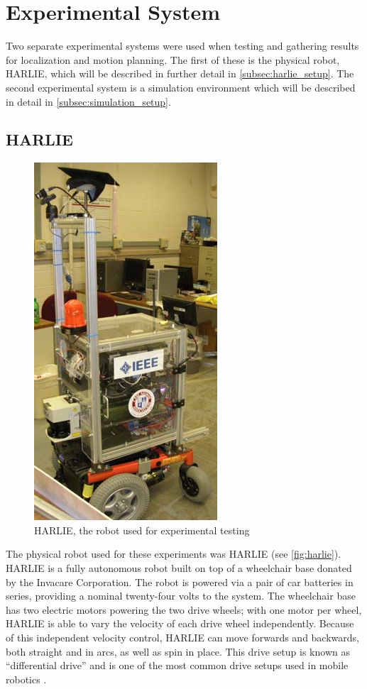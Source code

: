 \section{Experimental System}\label{sec:experimental_system}

Two separate experimental systems were used when testing and gathering results for localization and motion planning. The first of these is the physical robot, HARLIE, which will be described in further detail in \autoref{subsec:harlie_setup}. The second experimental system is a simulation environment which will be described in detail in \autoref{subsec:simulation_setup}.

\subsection{HARLIE}\label{subsec:harlie_setup}

\begin{figure}
\centering
\includegraphics[height=0.5\textheight]{images/harlie}
\caption{HARLIE, the robot used for experimental testing \label{fig:harlie}}
\end{figure}

The physical robot used for these experiments was HARLIE (see \autoref{fig:harlie}). HARLIE is a fully autonomous robot built on top of a wheelchair base donated by the Invacare Corporation. The robot is powered via a pair of car batteries in series, providing a nominal twenty-four volts to the system. The wheelchair base has two electric motors powering the two drive wheels; with one motor per wheel, HARLIE is able to vary the velocity of each drive wheel independently. Because of this independent velocity control, HARLIE can move forwards and backwards, both straight and in arcs, as well as spin in place. This drive setup is known as ``differential drive'' and is one of the most common drive setups used in mobile robotics \autocite{Lav06}.

